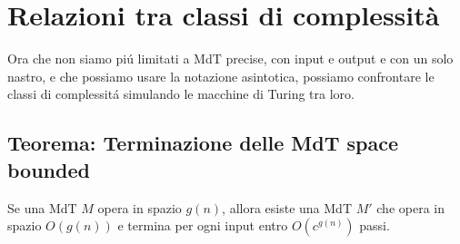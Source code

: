\section{Relazioni tra classi di complessità}
Ora che non siamo piú limitati a MdT precise, con input e output e con un solo nastro, e che possiamo usare la notazione asintotica, possiamo confrontare le classi di complessitá simulando le macchine di Turing tra loro. \\

\subsection{Teorema: Terminazione delle MdT space bounded}
Se una MdT $M$ opera in spazio $g(n)$, allora esiste una MdT $M'$ che opera in spazio $O(g(n))$ e termina per ogni input entro $O(c^{g(n)})$ passi.
